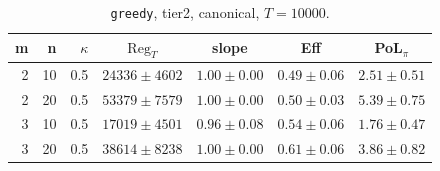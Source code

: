 \begin{table}[htbp]
\centering
\scriptsize
\caption{\texttt{greedy}, tier2, canonical, $T=10000$.}
\label{tab:tier2_long_greedy}
\begin{tabular}{@{}rrrcccc@{}}
\toprule
m & n & $\kappa$ & $\mathrm{Reg}_T$ & slope & Eff & PoL$_\pi$ \\
\midrule
2 & 10 & 0.5 & $24336 \pm 4602$ & $1.00 \pm 0.00$ & $0.49 \pm 0.06$ & $2.51 \pm 0.51$ \\
2 & 20 & 0.5 & $53379 \pm 7579$ & $1.00 \pm 0.00$ & $0.50 \pm 0.03$ & $5.39 \pm 0.75$ \\
\midrule
3 & 10 & 0.5 & $17019 \pm 4501$ & $0.96 \pm 0.08$ & $0.54 \pm 0.06$ & $1.76 \pm 0.47$ \\
3 & 20 & 0.5 & $38614 \pm 8238$ & $1.00 \pm 0.00$ & $0.61 \pm 0.06$ & $3.86 \pm 0.82$ \\
\bottomrule
\end{tabular}
\end{table}
